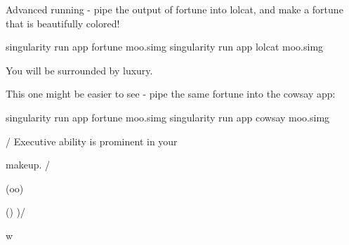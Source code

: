 \documentclass[letterpaper,10pt,english]{sphinxmanual}
\begin{document}
Advanced running - pipe the output of fortune into lolcat, and make a
fortune that is beautifully colored!

%
\begin{sphinxVerbatim}[commandchars=\\\{\}]
singularity run \PYGZhy{}\PYGZhy{}app fortune moo.simg \textbar{} singularity run \PYGZhy{}\PYGZhy{}app lolcat moo.simg

You will be surrounded by luxury.
\end{sphinxVerbatim}

This one might be easier to see - pipe the same fortune into the cowsay
app:

%
\begin{sphinxVerbatim}[commandchars=\\\{\}]
singularity run \PYGZhy{}\PYGZhy{}app fortune moo.simg \textbar{} singularity run \PYGZhy{}\PYGZhy{}app cowsay moo.simg

 \PYGZus{}\PYGZus{}\PYGZus{}\PYGZus{}\PYGZus{}\PYGZus{}\PYGZus{}\PYGZus{}\PYGZus{}\PYGZus{}\PYGZus{}\PYGZus{}\PYGZus{}\PYGZus{}\PYGZus{}\PYGZus{}\PYGZus{}\PYGZus{}\PYGZus{}\PYGZus{}\PYGZus{}\PYGZus{}\PYGZus{}\PYGZus{}\PYGZus{}\PYGZus{}\PYGZus{}\PYGZus{}\PYGZus{}\PYGZus{}\PYGZus{}\PYGZus{}\PYGZus{}\PYGZus{}\PYGZus{}\PYGZus{}\PYGZus{}\PYGZus{}\PYGZus{}\PYGZus{}

/ Executive ability is prominent in your \PYGZbs{}

\PYGZbs{} make\PYGZhy{}up.                               /

 \PYGZhy{}\PYGZhy{}\PYGZhy{}\PYGZhy{}\PYGZhy{}\PYGZhy{}\PYGZhy{}\PYGZhy{}\PYGZhy{}\PYGZhy{}\PYGZhy{}\PYGZhy{}\PYGZhy{}\PYGZhy{}\PYGZhy{}\PYGZhy{}\PYGZhy{}\PYGZhy{}\PYGZhy{}\PYGZhy{}\PYGZhy{}\PYGZhy{}\PYGZhy{}\PYGZhy{}\PYGZhy{}\PYGZhy{}\PYGZhy{}\PYGZhy{}\PYGZhy{}\PYGZhy{}\PYGZhy{}\PYGZhy{}\PYGZhy{}\PYGZhy{}\PYGZhy{}\PYGZhy{}\PYGZhy{}\PYGZhy{}\PYGZhy{}\PYGZhy{}

        \PYGZbs{}   \PYGZca{}\PYGZus{}\PYGZus{}\PYGZca{}

         \PYGZbs{}  (oo)\PYGZbs{}\PYGZus{}\PYGZus{}\PYGZus{}\PYGZus{}\PYGZus{}\PYGZus{}\PYGZus{}

            (\PYGZus{}\PYGZus{})\PYGZbs{}       )\PYGZbs{}/\PYGZbs{}

                \textbar{}\textbar{}\PYGZhy{}\PYGZhy{}\PYGZhy{}\PYGZhy{}w \textbar{}

                \textbar{}\textbar{}     \textbar{}\textbar{}
\end{sphinxVerbatim}
\end{document}
